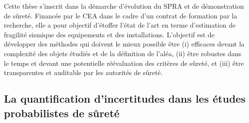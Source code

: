 





Cette thèse s'inscrit dans la démarche d'évolution du SPRA et de démonstration de sûreté. Financée par le CEA dans le cadre d'un contrat de formation par la recherche, elle a pour objectif d'étoffer l'état de l'art en terme d'estimation de fragilité sismique des equipements et des installations.
L'objectif est de développer des méthodes qui doivent le mieux possible être (i) efficaces devant la complexité des objets étudiés et de la définition de l'aléa, (ii) être robustes dans le temps et devant une potentielle réévaluation des critères de sûreté, et (iii) être transparentes et auditable par les autorités de sûreté.






\subsection{La quantification d'incertitudes dans les études probabilistes de sûreté} %


